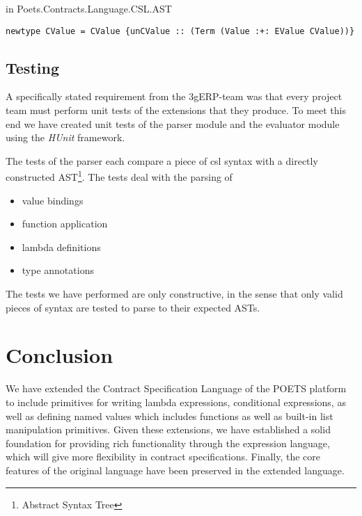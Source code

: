 \documentclass[10pt,a4paper,final,oneside,openany,article]{memoir}
\begin{document}
in Poets.Contracts.Language.CSL.AST
\begin{lstlisting}
newtype CValue = CValue {unCValue :: (Term (Value :+: EValue CValue))}
\end{lstlisting}


\lstset{language=CSL} %

\section{Testing}
A specifically stated requirement from the 3gERP-team was that every
project team must perform unit tests of the extensions that they
produce. To meet this end we have created unit tests of the parser
module and the evaluator module using the \emph{HUnit} framework.

The tests of the parser each compare a piece of csl syntax with a
directly constructed AST\footnote{Abstract Syntax Tree}.  The tests
deal with the parsing of

\begin{itemize}

  \item value bindings

  \item function application

  \item lambda definitions

  \item type annotations

\end{itemize}

The tests we have performed are only constructive, in the sense that
only valid pieces of syntax are tested to parse to their expected
ASTs.

\chapter{Conclusion}
We have extended the Contract Specification Language of the POETS
platform to include primitives for writing lambda expressions,
conditional expressions, as well as defining named values which includes
functions as well as built-in list manipulation primitives. Given these
extensions, we have established a solid foundation for providing rich
functionality through the expression language, which will give more
flexibility in contract specifications.
Finally, the core features of the original language \cite[page
4]{hvitved10} have been preserved in the extended language.
\end{document}
